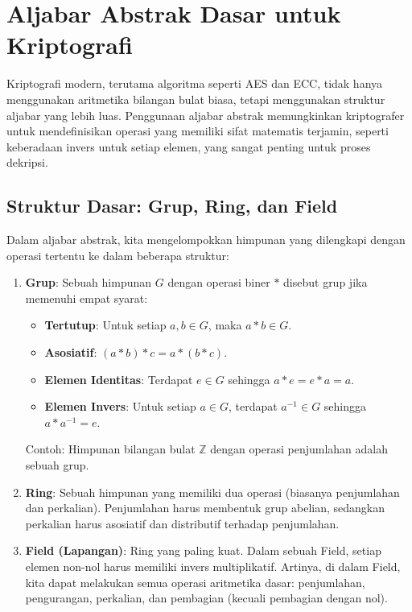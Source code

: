 \section{Aljabar Abstrak Dasar untuk Kriptografi}

Kriptografi modern, terutama algoritma seperti AES dan ECC, tidak hanya menggunakan aritmetika bilangan bulat biasa, tetapi menggunakan struktur aljabar yang lebih luas. Penggunaan aljabar abstrak memungkinkan kriptografer untuk mendefinisikan operasi yang memiliki sifat matematis terjamin, seperti keberadaan invers untuk setiap elemen, yang sangat penting untuk proses dekripsi.

\subsection{Struktur Dasar: Grup, Ring, dan Field}

Dalam aljabar abstrak, kita mengelompokkan himpunan yang dilengkapi dengan operasi tertentu ke dalam beberapa struktur:

\begin{enumerate}
    \item \textbf{Grup}: Sebuah himpunan $G$ dengan operasi biner $*$ disebut grup jika memenuhi empat syarat:
    \begin{itemize}
        \item \textbf{Tertutup}: Untuk setiap $a, b \in G$, maka $a * b \in G$.
        \item \textbf{Asosiatif}: $(a * b) * c = a * (b * c)$.
        \item \textbf{Elemen Identitas}: Terdapat $e \in G$ sehingga $a * e = e * a = a$.
        \item \textbf{Elemen Invers}: Untuk setiap $a \in G$, terdapat $a^{-1} \in G$ sehingga $a * a^{-1} = e$.
    \end{itemize}
    Contoh: Himpunan bilangan bulat $\mathbb{Z}$ dengan operasi penjumlahan adalah sebuah grup.

    \item \textbf{Ring}: Sebuah himpunan yang memiliki dua operasi (biasanya penjumlahan dan perkalian). Penjumlahan harus membentuk grup abelian, sedangkan perkalian harus asosiatif dan distributif terhadap penjumlahan.

    \item \textbf{Field (Lapangan)}: Ring yang paling kuat. Dalam sebuah Field, setiap elemen non-nol harus memiliki invers multiplikatif. Artinya, di dalam Field, kita dapat melakukan semua operasi aritmetika dasar: penjumlahan, pengurangan, perkalian, dan pembagian (kecuali pembagian dengan nol).
\end{enumerate}

